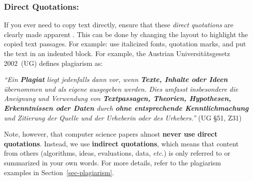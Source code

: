 \documentclass[11pt,a4paper]{article}
\begin{document}
\subsubsection*{Direct Quotations:}
If you ever need to copy text directly, ensure that these \emph{direct quotations} are clearly made apparent .
This can be done by changing the layout to highlight the copied text passages. For example: use italicized fonts, quotation marks, and put the text in an indented block.
% 
For example, the Austrian Universitätsgesetz 2002~(UG) defines plagiarism as:
\begin{center}
\begin{minipage}{0.75\textwidth}
\emph{``Ein \textbf{Plagiat} liegt jedenfalls dann vor, wenn \textbf{Texte, Inhalte oder Ideen} übernommen und als eigene ausgegeben werden. Dies umfasst insbesondere die Aneignung und Verwendung von \textbf{Textpassagen, Theorien, Hypothesen, Erkenntnissen oder Daten} durch  \textbf{ohne entsprechende Kenntlichmachung} und Zitierung der Quelle und der Urheberin oder des Urhebers.''} (UG §51, Z31)
\end{minipage}
\end{center}

Note, however, that computer science papers almost \textbf{never use direct quotations}.
Instead, we use \textbf{indirect quotations}, which means that content from others (algorithms, ideas, evaluations, data, \emph{etc.}) is only referred to or summarized in your own words.
For more details, refer to the plagiarism examples in Section~\ref{sec-plagiarism}.
\end{document}
